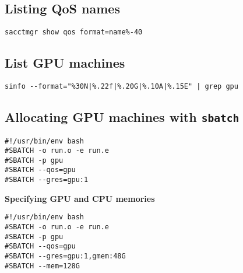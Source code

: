 \subsection{Listing QoS names}
\verb|sacctmgr show qos format=name%-40|

\subsection{List GPU machines}
\verb!sinfo --format="%30N|%.22f|%.20G|%.10A|%.15E" | grep gpu!

\subsection{Allocating GPU machines with \texttt{sbatch}}
\begin{verbatim}
#!/usr/bin/env bash
#SBATCH -o run.o -e run.e
#SBATCH -p gpu
#SBATCH --qos=gpu
#SBATCH --gres=gpu:1
\end{verbatim}

\textbf{Specifying GPU and CPU memories}\\
\begin{verbatim}
#!/usr/bin/env bash
#SBATCH -o run.o -e run.e
#SBATCH -p gpu
#SBATCH --qos=gpu
#SBATCH --gres=gpu:1,gmem:48G
#SBATCH --mem=128G
\end{verbatim}
